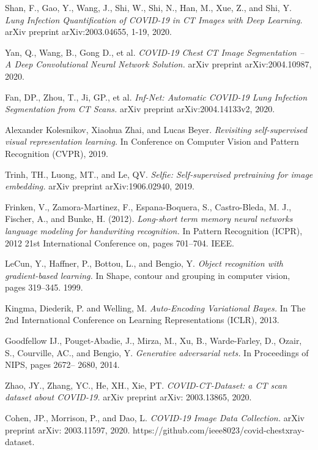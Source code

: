 \begin{thebibliography}{1}
	 Shan, F., Gao, Y., Wang, J., Shi, W., Shi, N., Han, M., Xue, Z., and Shi, Y. \textit{Lung Infection Quantification of COVID-19 in CT Images with Deep Learning.} arXiv preprint arXiv:2003.04655, 1-19, 2020.

	 Yan, Q., Wang, B., Gong D., et al. \textit{COVID-19 Chest CT Image Segmentation – A Deep Convolutional Neural Network Solution.} arXiv preprint arXiv:2004.10987, 2020.

	 Fan, DP., Zhou, T., Ji, GP., et al. \textit{Inf-Net: Automatic COVID-19 Lung Infection Segmentation from CT Scans.} arXiv preprint arXiv:2004.14133v2, 2020.

	 Alexander Kolesnikov, Xiaohua Zhai, and Lucas Beyer. \textit{Revisiting self-supervised visual representation learning.} In Conference on Computer Vision and Pattern Recognition (CVPR), 2019.

	 Trinh, TH., Luong, MT., and Le, QV. \textit{Selfie: Self-supervised pretraining for image	embedding.} arXiv preprint arXiv:1906.02940, 2019.

	 Frinken, V., Zamora-Martinez, F., Espana-Boquera, S., Castro-Bleda, M. J., Fischer, A., and Bunke, H. (2012). \textit{Long-short term memory neural networks language modeling for handwriting recognition.} In Pattern Recognition (ICPR), 2012 21st International Conference on, pages 701–704. IEEE.

	  LeCun, Y., Haffner, P., Bottou, L., and Bengio, Y. \textit{Object recognition with gradient-based learning.} In Shape, contour and grouping in computer vision, pages 319–345. 1999.

	 Kingma, Diederik, P. and Welling, M. \textit{Auto-Encoding Variational Bayes.} In The 2nd International Conference on Learning Representations (ICLR), 2013.

	  Goodfellow IJ., Pouget-Abadie, J., Mirza, M., Xu, B., Warde-Farley, D., Ozair, S., Courville, AC., and Bengio, Y. \textit{Generative adversarial nets.} In Proceedings of NIPS, pages 2672– 2680, 2014.

	 Zhao, JY., Zhang, YC., He, XH., Xie, PT. \textit{COVID-CT-Dataset: a CT scan dataset about COVID-19.} arXiv preprint arXiv: 2003.13865, 2020.

	 Cohen, JP., Morrison, P., and Dao, L.  \textit{COVID-19 Image Data Collection.} arXiv preprint arXiv: 2003.11597, 2020. https://github.com/ieee8023/covid-chestxray-dataset.


\end{thebibliography}
